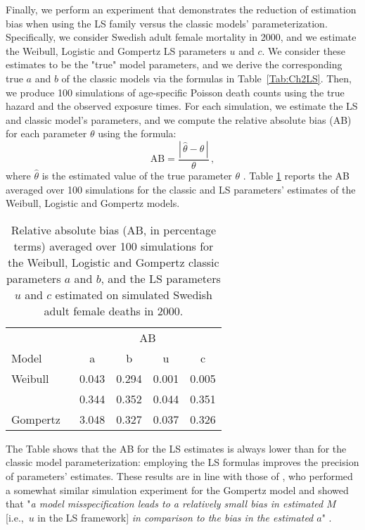 \documentclass[Thesis]{subfiles}
\begin{document}
Finally, we perform an experiment that demonstrates the reduction of estimation bias when using the LS family versus the classic models' parameterization. Specifically, we consider Swedish adult female mortality in 2000, and we estimate the Weibull, Logistic and Gompertz LS parameters $u$ and $c$. We consider these estimates to be the "true" model parameters, and we derive the corresponding true $a$ and $b$ of the classic models via the formulas in Table~\ref{Tab:Ch2LS}. Then, we produce 100 simulations of age-specific Poisson death counts using the true hazard and the observed exposure times. For each simulation, we estimate the LS and classic model's parameters, and we compute the relative absolute bias (AB) for each parameter $\theta$ using the formula: 
\begin{equation}\label{Eq:AB}
\mathrm{AB} = \frac{|\,\hat{\theta}-\theta\,|}{\theta} \, ,
\end{equation}
where $\hat{\theta}$ is the estimated value of the true parameter $\theta$ \citep{pletcher1999model}. Table \ref{Tab:Ch2Simul} reports the AB averaged over 100 simulations for the classic and LS parameters' estimates of the Weibull, Logistic and Gompertz models.

\begin{table}[!ht]
	\centering
	\caption{Relative absolute bias (AB, in percentage terms) averaged over 100 simulations for the Weibull, Logistic and Gompertz classic parameters $a$ and $b$, and the LS parameters $u$ and $c$ estimated on simulated Swedish adult female deaths in 2000.}
	\label{Tab:Ch2Simul}
	\begin{tabular}{@{}lcccc@{}}
		\toprule
		& \multicolumn{4}{c}{AB}             \\ \cmidrule(l){2-5} 
		\multicolumn{1}{l|}{Model $\quad\quad$}    & a & \multicolumn{1}{c|}{b} & u & c \\ \midrule
		\multicolumn{1}{l|}{Weibull}  & 0.043  &  \multicolumn{1}{c|}{0.294}  &  0.001 &  0.005 \\ \rowcolor{my-grey}	
		\multicolumn{1}{l|}{Logistic} & 0.344  & \multicolumn{1}{c|}{0.352}  &  0.044 &  0.351 \\
		\multicolumn{1}{l|}{Gompertz} & 3.048  & \multicolumn{1}{c|}{0.327}  &  0.037 &  0.326 \\ \bottomrule
	\end{tabular}
\end{table}

The Table shows that the AB for the LS estimates is always lower than for the classic model parameterization: employing the LS formulas improves the precision of parameters' estimates. These results are in line with those of \citeauthor{missov2015gompertz}, who performed a somewhat similar simulation experiment for the Gompertz model and showed that "\textit{a model misspecification leads to a relatively small bias in estimated $M$} [i.e.,~$u$ in the LS framework] \textit{in comparison to the bias in the estimated $a$}" \cite[][p.~1039]{missov2015gompertz}.
\end{document}
